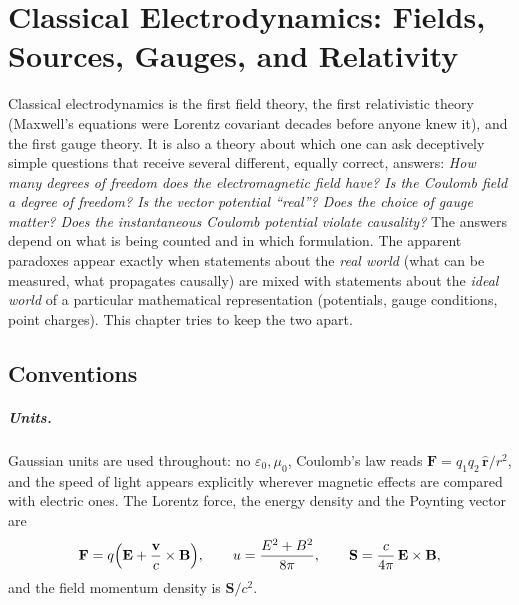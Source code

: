 \documentclass[11pt,a4paper]{book}
\begin{document}
\chapter[Classical Electrodynamics]{Classical Electrodynamics: Fields, Sources, Gauges, and Relativity}
\label{ch:ed}

Classical electrodynamics is the first field theory, the first relativistic theory
(Maxwell's equations were Lorentz covariant decades before anyone knew it), and the
first gauge theory. It is also a theory about which one can ask deceptively simple
questions that receive several different, equally correct, answers:
\emph{How many degrees of freedom does the electromagnetic field have? Is the Coulomb
field a degree of freedom? Is the vector potential ``real''? Does the choice of gauge
matter? Does the instantaneous Coulomb potential violate causality?}
The answers depend on what is being counted and in which formulation. The apparent
paradoxes appear exactly when statements about the \emph{real world} (what can be
measured, what propagates causally) are mixed with statements about the \emph{ideal
world} of a particular mathematical representation (potentials, gauge conditions,
point charges). This chapter tries to keep the two apart.

\section{Conventions}
\label{sec:conventions}

\paragraph{Units.} Gaussian units are used throughout: no $\varepsilon_0,\mu_0$, Coulomb's
law reads $\mathbf F=q_1q_2\,\hat{\mathbf r}/r^2$, and the speed of light appears
explicitly wherever magnetic effects are compared with electric ones. The Lorentz force,
the energy density and the Poynting vector are
\begin{equation}
\mathbf F=q\Bigl(\mathbf E+\frac{\mathbf v}{c}\times\mathbf B\Bigr),\qquad
u=\frac{E^2+B^2}{8\pi},\qquad
\mathbf S=\frac{c}{4\pi}\,\mathbf E\times\mathbf B ,
\end{equation}
and the field momentum density is $\mathbf S/c^2$.
\end{document}
